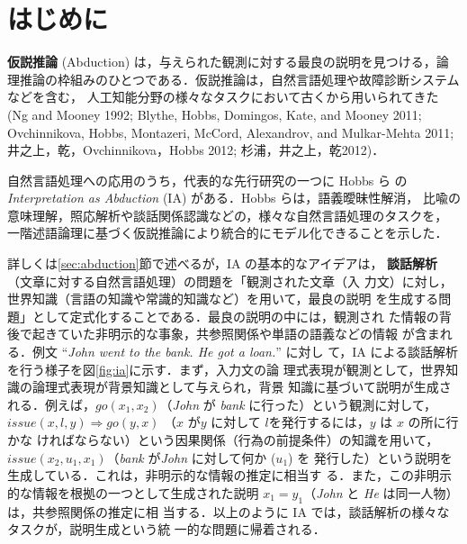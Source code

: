 \documentclass[japanese]{jnlp_1.4}
\begin{document}
\maketitle


\section{はじめに}

\textbf{仮説推論} (Abduction) は，与えられた観測に対する最良の説明を見つける，論
理推論の枠組みのひとつである．仮説推論は，自然言語処理や故障診断システムなどを含む，
人工知能分野の様々なタスクにおいて古くから用いられてきた
    (Ng and Mooney 1992; Blythe, Hobbs, Domingos, Kate, and Mooney 2011; Ovchinnikova, Hobbs, Montazeri, McCord, Alexandrov, and Mulkar-Mehta 2011; 井之上，乾，Ovchinnikova，Hobbs 2012; 杉浦，井之上，乾2012)．\nocite{Ng92,Blythe11,Ovch11,Inoue12,Sugiura12}



自然言語処理への応用のうち，代表的な先行研究の一つに Hobbs ら \cite{Hobbs93} の
\textit{Interpretation as Abduction} (IA) がある．Hobbs らは，語義曖昧性解消，
比喩の意味理解，照応解析や談話関係認識などの，様々な自然言語処理のタスクを，
一階述語論理に基づく仮説推論により統合的にモデル化できることを示した．

詳しくは\ref{sec:abduction}節で述べるが，IA の基本的なアイデアは，
\textbf{談話解析}（文章に対する自然言語処理）の問題を「観測された文章（入
力文）に対し，世界知識（言語の知識や常識的知識など）を用いて，最良の説明
を生成する問題」として定式化することである．最良の説明の中には，観測され
た情報の背後で起きていた非明示的な事象，共参照関係や単語の語義などの情報
が含まれる．例文 ``{\it John went to the bank. He got a loan.}'' に対し
て，IA による談話解析を行う様子を図\ref{fig:ia}に示す．まず，入力文の論
理式表現が観測として，世界知識の論理式表現が背景知識として与えられ，背景
知識に基づいて説明が生成される．例えば，$\mathit{go}(x_1,x_2)$（\textit{John} が
\textit{bank} に行った）という観測に対して，$\mathit{issue}(x,l,y) \Rightarrow
go(y,x)$ （$x$ が$y$ に対して $l$を発行するには，$y$ は $x$ の所に行かな
ければならない）という因果関係（行為の前提条件）の知識を用いて，
$\mathit{issue}(x_2,u_1,x_1)$（\textit{bank} が\textit{John} に対して何か ($u_1$) を
発行した）という説明を生成している．これは，非明示的な情報の推定に相当す
る．また，この非明示的な情報を根拠の一つとして生成された説明
$x_1=y_1$（\textit{John} と \textit{He} は同一人物）は，共参照関係の推定に相
当する．以上のように IA では，談話解析の様々なタスクが，説明生成という統
一的な問題に帰着される．
\end{document}
